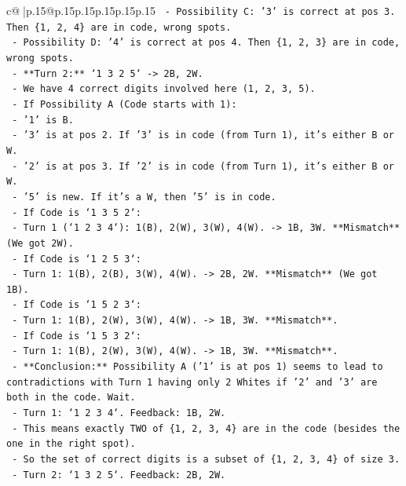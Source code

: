 \documentclass{article}
\begin{document}
{\begin{supertabular}{c@{$\;$}|p{.15\linewidth}@{}p{.15\linewidth}p{.15\linewidth}p{.15\linewidth}p{.15\linewidth}p{.15\linewidth}}
{{{\texttt{        {-} Possibility C: '3' is correct at pos 3. Then \{1, 2, 4\} are in code, wrong spots.} \\
\texttt{        {-} Possibility D: '4' is correct at pos 4. Then \{1, 2, 3\} are in code, wrong spots.} \\
\texttt{      {-} **Turn 2:** `1 3 2 5` {-}> 2B, 2W.} \\
\texttt{        {-} We have 4 correct digits involved here (1, 2, 3, 5).} \\
\texttt{        {-} If Possibility A (Code starts with 1):} \\
\texttt{          {-} '1' is B.} \\
\texttt{          {-} '3' is at pos 2. If '3' is in code (from Turn 1), it's either B or W.} \\
\texttt{          {-} '2' is at pos 3. If '2' is in code (from Turn 1), it's either B or W.} \\
\texttt{          {-} '5' is new. If it's a W, then '5' is in code.} \\
\texttt{          {-} If Code is `1 3 5 2`:} \\
\texttt{            {-} Turn 1 (`1 2 3 4`): 1(B), 2(W), 3(W), 4(W). {-}> 1B, 3W. **Mismatch** (We got 2W).} \\
\texttt{          {-} If Code is `1 2 5 3`:} \\
\texttt{            {-} Turn 1: 1(B), 2(B), 3(W), 4(W). {-}> 2B, 2W. **Mismatch** (We got 1B).} \\
\texttt{          {-} If Code is `1 5 2 3`:} \\
\texttt{            {-} Turn 1: 1(B), 2(W), 3(W), 4(W). {-}> 1B, 3W. **Mismatch**.} \\
\texttt{          {-} If Code is `1 5 3 2`:} \\
\texttt{            {-} Turn 1: 1(B), 2(W), 3(W), 4(W). {-}> 1B, 3W. **Mismatch**.} \\
\texttt{        {-} **Conclusion:** Possibility A ('1' is at pos 1) seems to lead to contradictions with Turn 1 having only 2 Whites if '2' and '3' are both in the code. Wait.} \\
\texttt{          {-} Turn 1: `1 2 3 4`. Feedback: 1B, 2W.} \\
\texttt{          {-} This means exactly TWO of \{1, 2, 3, 4\} are in the code (besides the one in the right spot).} \\
\texttt{          {-} So the set of correct digits is a subset of \{1, 2, 3, 4\} of size 3.} \\
\texttt{          {-} Turn 2: `1 3 2 5`. Feedback: 2B, 2W.} \\
}}}
\end{supertabular}}
\end{document}
